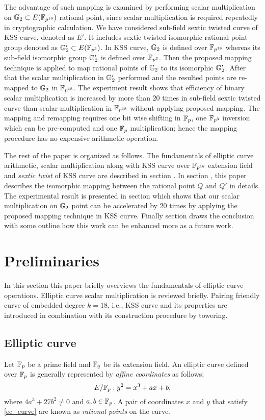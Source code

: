         The advantage of such mapping is examined by performing scalar multiplication on ${\mathbb{G}}_{2} \subset E(\mathbb{F}_{p^{18}})$ rational point, since scalar multiplication is required repeatedly in cryptographic calculation. 
        We have considered sub-field sextic twisted curve of KSS curve, denoted as $E'$. It includes sextic twisted isomorphic rational point group denoted as ${\mathbb{G}}_{2}' \subset E(\mathbb{F}_{p^3})$. In KSS curve, ${\mathbb{G}}_{2}$ is defined over $\mathbb{F}_{p^{18}}$ whereas its sub-field isomorphic group ${\mathbb{G}}_{2}'$ is defined over $\mathbb{F}_{p^3}$. Then the proposed mapping technique is applied to map rational points of ${\mathbb{G}}_{2}$ to its isomorphic ${\mathbb{G}}_{2}'$. After that the scalar multiplication in ${\mathbb{G}}_{2}'$ performed and the resulted points are re-mapped to ${\mathbb{G}}_{2}$ in $\mathbb{F}_{p^{18}}$.
        The experiment result shows  that efficiency of binary scalar multiplication is increased by more than 20 times in sub-field sextic twisted curve than scalar multiplication in $\mathbb{F}_{p^{18}}$ without applying proposed mapping. The mapping and remapping requires one bit wise shifting in ${\mathbb{F}}_{p}$, one $\mathbb{F}_{p^3}$ inversion which can be pre-computed and one ${\mathbb{F}}_{p}$ multiplication; hence the mapping procedure has no expensive arithmetic operation.
        
        The rest of the paper is organized as follows. 
        The fundamentals of elliptic curve arithmetic, scalar multiplication along with KSS curve over $\mathbb{F}_{p^{18}}$ extension field and \textit{sextic twist} of KSS curve are described in section .
        In section , this paper describes the isomorphic mapping between the rational point $Q$ and $Q'$ in details. The experimental result is presented in section  which shows that our scalar multiplication on ${\mathbb{G}}_{2}$ point can be accelerated by 20 times by applying the proposed mapping technique in KSS curve. Finally section  draws the conclusion with some outline how this work can be enhanced more as a future work.
        
        \section{Preliminaries}
        In this section this paper briefly overviews the fundamentals of elliptic curve operations. Elliptic curve scalar multiplication is reviewed briefly. Pairing friendly curve of embedded degree $k=18$, i.e., KSS curve and its properties are introduced in combination  with its construction procedure by towering.
        \subsection{Elliptic curve}
        Let ${\mathbb{F}}_{p}$ be a prime field and ${\mathbb{F}}_{q}$ be its extension field. An elliptic curve \cite{washington2003elliptic} defined over ${\mathbb{F}}_{p}$ is generally represented by \textit{affine coordinates} \cite{Silverman} as follows;
        \begin{equation}\label{ec_curve}
        E/{\mathbb{F}}_{p} : y^2=x^3+ax+b,
        \end{equation}
        where $ 4a^3+27b^2 \neq 0$ and $a,b \in {\mathbb{F}}_{p}$. A pair of coordinates $x$ and $y$ that satisfy \eqref{ec_curve} are known as \textit{rational points} on the curve. 
        
